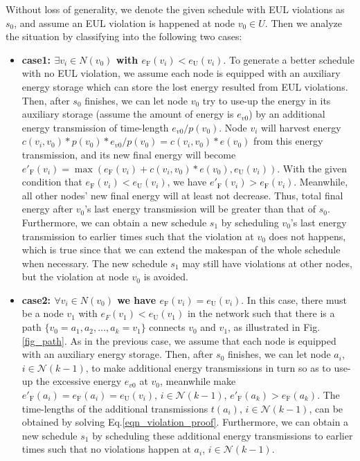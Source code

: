 \documentclass[12pt,journal,onecolumn,draftcls]{IEEEtran}
\begin{document}
\begin{IEEEproof}
Without loss of generality, we denote the given schedule with EUL violations as $s_0$, and assume an EUL violation is happened at node $v_0{\in}U$. Then we analyze the situation by classifying into the following two cases:

\begin{itemize}
\item{\textbf{case1: ${\exists}v_i{\in}N(v_0)$ with $e_\text{F}(v_i){<}e_\text{U}(v_i)$}}.
To generate a better schedule with no EUL violation, we assume each node is equipped with an auxiliary energy storage which can store the lost energy resulted from EUL violations. Then, after $s_0$ finishes, we can let node $v_0$ try to use-up the energy in its auxiliary storage (assume the amount of energy is $e_{v0}$) by an additional energy transmission of time-length $e_{v0}/p(v_0)$. Node $v_i$ will harvest energy $c(v_i,v_0){*}p(v_0)*{e_{v0}{/}p(v_0)}{=}c(v_i,v_0){*}e(v_0)$ from this energy transmission, and its new final energy will become $e'_\text{F}(v_i){=}\max(e_\text{F}(v_i){+}c(v_i,v_0){*}e(v_0),e_\text{U}(v_i))$. With the given condition that $e_\text{F}(v_i){<}e_\text{U}(v_i)$, we have $e'_\text{F}(v_i){>}e_\text{F}(v_i)$. Meanwhile, all other nodes' new final energy will at least not decrease. Thus, total final energy after $v_0$'s last energy transmission will be greater than that of $s_0$. Furthermore, we can obtain a new schedule $s_1$ by scheduling $v_0$'s last energy transmission to earlier times such that the violation at $v_0$ does not happens, which is true since that we can extend the makespan of the whole schedule when necessary. The new schedule $s_1$ may still have violations at other nodes, but the violation at node $v_0$ is avoided.

\item{\textbf{case2: ${\forall}v_i{\in}N(v_0)$ we have $e_\text{F}(v_i){=}e_\text{U}(v_i)$}}.
In this case, there must be a node $v_1$ with $e_F(v_1){<}e_\text{U}(v_1)$ in the network such that there is a path $\{v_0{=}a_1,a_2,\ldots,a_k{=}v_1\}$ connects $v_0$ and $v_1$, as illustrated in Fig.\ref{fig_path}. As in the previous case, we assume that each node is equipped with an auxiliary energy storage. Then, after $s_0$ finishes, we can let node $a_i$,$i{\in}\mathcal{N}(k{-}1)$, to make additional energy transmissions in turn so as to use-up the excessive energy $e_{v0}$ at $v_0$, meanwhile make $e'_\text{F}(a_i){=}e_\text{F}(a_i){=}e_\text{U}(v_i)$, $i{\in}\mathcal{N}(k{-}1)$, $e'_\text{F}(a_k){>}e_\text{F}(a_k)$. The time-lengths of the additional transmissions $t(a_i)$, $i{\in}\mathcal{N}(k{-}1)$, can be obtained by solving Eq.\eqref{eqn_violation_proof}. Furthermore, we can obtain a new schedule $s_1$ by scheduling these additional energy transmissions to earlier times such that no violations happen at $a_i$, $i{\in}\mathcal{N}(k{-}1)$.


\end{itemize}
\end{IEEEproof}
\end{document}
